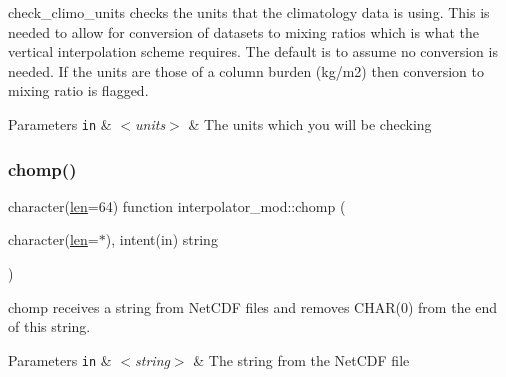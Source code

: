 check\+\_\+climo\+\_\+units checks the units that the climatology data is using. This is needed to allow for conversion of datasets to mixing ratios which is what the vertical interpolation scheme requires. The default is to assume no conversion is needed. If the units are those of a column burden (kg/m2) then conversion to mixing ratio is flagged. 


\begin{DoxyParams}[1]{Parameters}
\mbox{\tt in}  & {\em $<$units$>$} & The units which you will be checking \\
\hline
\end{DoxyParams}
\mbox{\label{namespaceinterpolator__mod_aa04edf3968e85b9668bf62703731acdc}} 
\subsubsection{\texorpdfstring{chomp()}{chomp()}}
{\footnotesize\ttfamily character(\hyperlink{namespaceinterpolator__mod_a6bd2ec3395203e1b6aba0610bfbfe16b}{len}=64) function interpolator\+\_\+mod\+::chomp (\begin{DoxyParamCaption}\item[{character(\hyperlink{namespaceinterpolator__mod_a6bd2ec3395203e1b6aba0610bfbfe16b}{len}=$\ast$), intent(in)}]{string }\end{DoxyParamCaption})\hspace{0.3cm}{\ttfamily [private]}}



chomp receives a string from Net\+C\+DF files and removes C\+H\+A\+R(0) from the end of this string. 


\begin{DoxyParams}[1]{Parameters}
\mbox{\tt in}  & {\em $<$string$>$} & The string from the Net\+C\+DF file \\
\hline
\end{DoxyParams}
\mbox{\label{namespaceinterpolator__mod_a1c8291f5d841abbe9cee8901503a806c}} 
